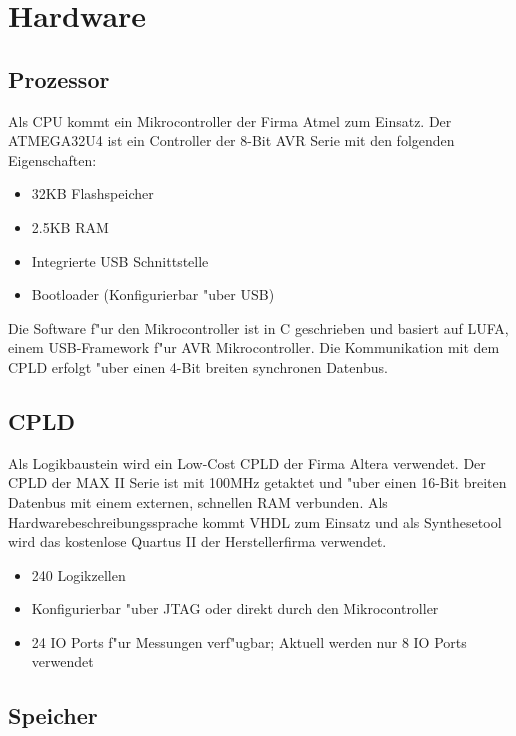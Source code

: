 \documentclass[
a4paper,
]{leaflet}
\begin{document}
\section{Hardware}

\subsection{Prozessor}

Als CPU kommt ein Mikrocontroller der Firma Atmel zum Einsatz. Der ATMEGA32U4 ist ein Controller der 8-Bit AVR Serie mit den folgenden Eigenschaften:

\begin{itemize}
  \item 32KB Flashspeicher
  \item 2.5KB RAM
  \item Integrierte USB Schnittstelle
  \item Bootloader (Konfigurierbar "uber USB)
\end{itemize}

Die Software f"ur den Mikrocontroller ist in C geschrieben und basiert auf LUFA, einem USB-Framework f"ur AVR Mikrocontroller. Die Kommunikation mit dem CPLD erfolgt "uber einen 4-Bit breiten synchronen Datenbus.

\subsection{CPLD}

Als Logikbaustein wird ein Low-Cost CPLD der Firma Altera verwendet. Der CPLD der MAX II Serie ist mit 100MHz getaktet und "uber einen 16-Bit breiten Datenbus mit einem externen, schnellen RAM verbunden. Als Hardwarebeschreibungssprache kommt VHDL zum Einsatz und als Synthesetool wird das kostenlose Quartus II der Herstellerfirma verwendet.

\begin{itemize}
  \item 240 Logikzellen
  \item Konfigurierbar "uber JTAG oder direkt durch den Mikrocontroller
  \item 24 IO Ports f"ur Messungen verf"ugbar; Aktuell werden nur 8 IO Ports verwendet
\end{itemize}

\subsection{Speicher}
\end{document}
